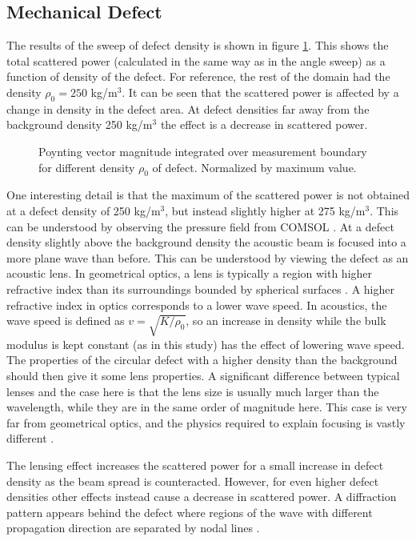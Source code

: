 \documentclass[11pt,twoside]{eitExjobb}
\begin{document}
	\subsection{Mechanical Defect}
	The results of the sweep of defect density is shown in figure \ref{fig:res-mech-power}. This shows the total scattered power (calculated in the same way as in the angle sweep) as a function of density of the defect. For reference, the rest of the domain had the density $\rho_0 = 250$ kg/m$^3$. It can be seen that the scattered power is affected by a change in density in the defect area. At defect densities far away from the background density 250 kg/m$^3$ the effect is a decrease in scattered power.
	
	\begin{figure}[h]
		\centering
		\resizebox{\textwidth}{!}{
			
		}
		\caption{\label{fig:res-mech-power} Poynting vector magnitude integrated over measurement boundary for different density $\rho_0$ of defect. Normalized by maximum value.}
	\end{figure}
	
	One interesting detail is that the maximum of the scattered power is not obtained at a defect density of 250 kg/m$^3$, but instead slightly higher at 275 kg/m$^3$. This can be understood by observing the pressure field from COMSOL . At a defect density slightly above the background density the acoustic beam is focused into a more plane wave than before. This can be understood by viewing the defect as an acoustic lens. In geometrical optics, a lens is typically a region with higher refractive index than its surroundings bounded by spherical surfaces \cite{Saleh2007}. A higher refractive index in optics corresponds to a lower wave speed. In acoustics, the wave speed is defined as $v = \sqrt{K/\rho_0}$, so an increase in density while the bulk modulus is kept constant (as in this study) has the effect of lowering wave speed. The properties of the circular defect with a higher density than the background should then give it some lens properties. A significant difference between typical lenses and the case here is that the lens size is usually much larger than the wavelength, while they are in the same order of magnitude here. This case is very far from geometrical optics, and the physics required to explain focusing is vastly different \cite{Fletcher2001}.
	
	The lensing effect increases the scattered power for a small increase in defect density as the beam spread is counteracted. However, for even higher defect densities other effects instead cause a decrease in scattered power. A diffraction pattern appears behind the defect where regions of the wave with different propagation direction are separated by nodal lines .
	
\end{document}

